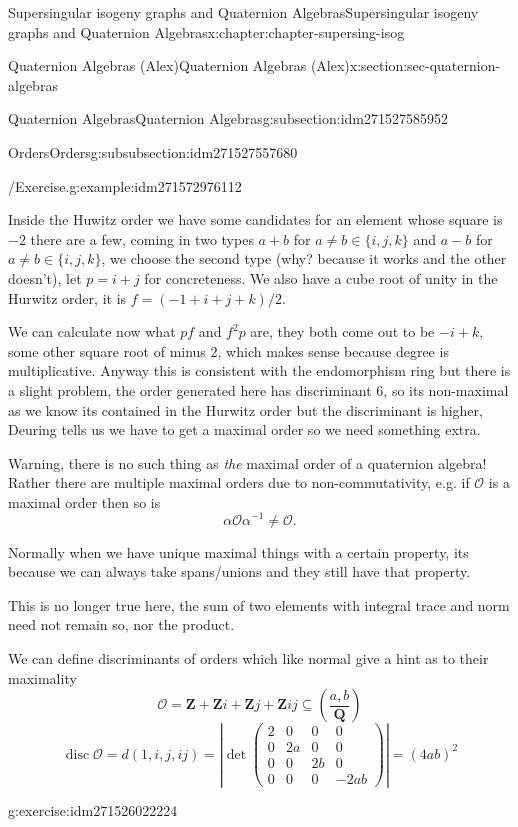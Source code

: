 \documentclass[oneside,10pt,]{book}
\numberwithin{equation}{section}
\newcommand{\inv}{^{-1}}
\newcommand{\legendre}[2]{\left(\frac{#1}{#2}\right)}
\newcommand{\ZZ}{\mathbf{Z}}
\newcommand{\QQ}{\mathbf{Q}}
\newcommand{\ints}{\mathcal{O}}
\DeclareMathOperator{\disc}{disc}
\newcommand{\amp}{&}
\begin{document}
\begin{chapterptx}{Supersingular isogeny graphs and Quaternion Algebras}{}{Supersingular isogeny graphs and Quaternion Algebras}{}{}{x:chapter:chapter-supersing-isog}
\begin{sectionptx}{Quaternion Algebras (Alex)}{}{Quaternion Algebras (Alex)}{}{}{x:section:sec-quaternion-algebras}
\begin{subsectionptx}{Quaternion Algebras}{}{Quaternion Algebras}{}{}{g:subsection:idm271527585952}
\begin{subsubsectionptx}{Orders}{}{Orders}{}{}{g:subsubsection:idm271527557680}
\begin{example}{\slash{}Exercise.}{g:example:idm271572976112}
\par
Inside the Huwitz order we have some candidates for an element whose square is \(-2\) there are a few, coming in two types \(a+ b\) for \(a \ne b \in \{i,j,k\}\) and \(a-b\) for \(a\ne b\in \{i,j,k\}\), we choose the second type (why? because it works and the other doesn't), let \(p = i + j\) for concreteness. We also have a cube root of unity in the Hurwitz order, it is \(f = (-1 + i + j + k)/2\).%
\par
We can calculate now what \(pf\) and \(f^2 p\) are, they both come out to be \(- i + k\), some other square root of minus 2, which makes sense because degree is multiplicative. Anyway this is consistent with the endomorphism ring but there is a slight problem, the order generated here has discriminant \(6\), so its non-maximal as we know its contained in the Hurwitz order but the discriminant is higher, Deuring tells us we have to get a maximal order so we need something extra.%
\end{example}
Warning, there is no such thing as \emph{the} maximal order of a quaternion algebra! Rather there are multiple maximal orders due to non-commutativity, e.g. if \(\ints\) is a maximal order then so is%
\begin{equation*}
\alpha \ints \alpha\inv \ne \ints\text{.}
\end{equation*}
%
\par
Normally when we have unique maximal things with a certain property, its because we can always take spans\slash{}unions and they still have that property.%
\par
This is no longer true here, the sum of two elements with integral trace and norm need not remain so, nor the product.%
\par
We can define discriminants of orders which like normal give a hint as to their maximality%
\begin{equation*}
\ints = \ZZ + \ZZ i + \ZZ j + \ZZ ij \subseteq \legendre{a,b}{\QQ}
\end{equation*}
%
\begin{equation*}
\disc \ints  = d(1,i,j,ij) = \left| \det\begin{pmatrix} 2 \amp 0 \amp 0\amp 0 \\ 0 \amp 2a \amp 0 \amp 0 \\ 0 \amp 0 \amp 2b \amp 0 \\ 0 \amp 0 \amp 0 \amp -2ab\end{pmatrix}\right| = (4ab)^2
\end{equation*}
%
\begin{inlineexercise}{}{g:exercise:idm271526022224}%

\end{inlineexercise}
\end{subsubsectionptx}
\end{subsectionptx}
\end{sectionptx}
\end{chapterptx}
\end{document}
